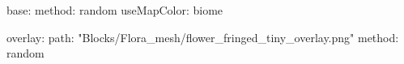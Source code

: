 base:
  method: random
  useMapColor: biome
  
overlay:
  path: "Blocks/Flora_mesh/flower_fringed_tiny_overlay.png"
  method: random